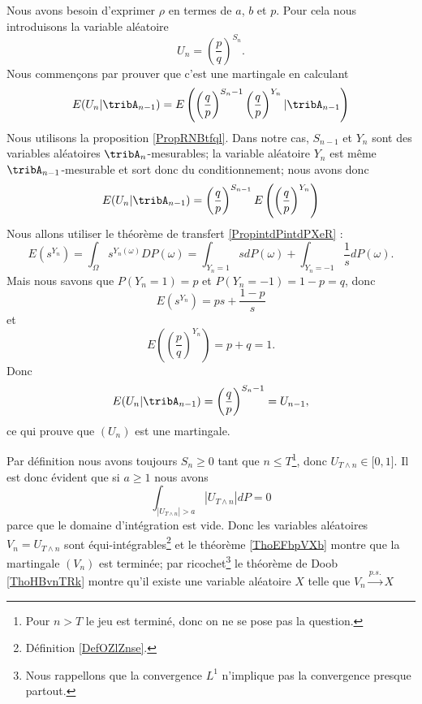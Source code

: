 Nous avons besoin d'exprimer \( \rho\) en termes de \( a\), \( b\) et \( p\). Pour cela nous introduisons la variable aléatoire
\begin{equation}
    U_n=\left( \frac{ p }{ q } \right)^{S_n}.
\end{equation}
Nous commençons par prouver que c'est une martingale en calculant
\begin{equation}
    E(U_n|\tribA_{n-1})=E\left( \left( \frac{ q }{ p } \right)^{S_n-1}\left( \frac{ q }{ p } \right)^{Y_n}|\tribA_{n-1} \right)
\end{equation}
Nous utilisons la proposition \ref{PropRNBtfql}. Dans notre cas, \( S_{n-1}\) et \( Y_n\) sont des variables aléatoires \( \tribA_n\)-mesurables; la variable aléatoire \( Y_n\) est même \( \tribA_{n-1}\)-mesurable et sort donc du conditionnement; nous avons donc
\begin{equation}    \label{EqWTkXcEK}
    E(U_n|\tribA_{n-1})=\left( \frac{ q }{ p } \right)^{S_{n-1}}E\left( \left( \frac{ q }{ p } \right)^{Y_n} \right)
\end{equation}
Nous allons utiliser le théorème de transfert \ref{PropintdPintdPXeR} : 
\begin{equation}
    E(s^{Y_n})=\int_{\Omega}s^{Y_n(\omega)}DP(\omega)=\int_{Y_n=1}sdP(\omega)+\int_{Y_n=-1}\frac{1}{ s }dP(\omega).
\end{equation}
Mais nous savons que \( P(Y_n=1)=p\) et \( P(Y_n=-1)=1-p=q\), donc
\begin{equation}
    E(s^{Y_n})=ps+\frac{ 1-p }{ s }
\end{equation}
et
\begin{equation}
    E\left( \left( \frac{ p }{ q } \right)^{Y_n} \right)=p+q=1.
\end{equation}
Donc
\begin{equation}
    E(U_n|\tribA_{n-1})=\left( \frac{ q }{ p } \right)^{S_n-1}=U_{n-1},
\end{equation}
ce qui prouve que \( (U_n)\) est une martingale.

Par définition nous avons toujours \( S_n\geq 0\) tant que \( n\leq T\)\footnote{Pour \( n>T\) le jeu est terminé, donc on ne se pose pas la question.}, donc \( U_{T\wedge n}\in\mathopen[ 0 , 1 \mathclose]\). Il est donc évident que si \( a\geq 1\) nous avons
\begin{equation}
    \int_{| U_{T\wedge n} |>a}| U_{T\wedge n} |dP=0
\end{equation}
parce que le domaine d'intégration est vide. Donc les variables aléatoires \( V_n=U_{T\wedge n}\) sont équi-intégrables\footnote{Définition \ref{DefOZlZnse}.} et le théorème \ref{ThoEFbpVXb} montre que la martingale \( (V_n)\) est terminée; par ricochet\footnote{Nous rappellons que la convergence \( L^1\) n'implique pas la convergence presque partout.} le théorème de Doob \ref{ThoHBvnTRk} montre qu'il existe une variable aléatoire \( X\) telle que $V_n\stackrel{p.s.}{\longrightarrow}X$
